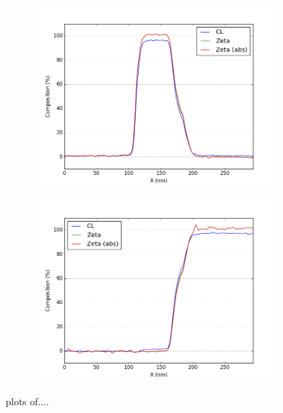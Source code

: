 \begin{figure}
\begin{subfigure}{.45\textwidth}
		\caption{}
		\label{fig:zeta_area1_as}
	\end{subfigure}
\hfill
		\begin{subfigure}{.45\textwidth}
			\centering
			\includegraphics[width=\linewidth]{fig/q/1_pd_nm}
			\caption{}
			\label{fig:zeta_area1_pd}
		\end{subfigure}%
	\hfill
		\begin{subfigure}{.45\textwidth}
			\centering
			\includegraphics[width=\linewidth]{fig/q/1_ge_nm}
			\caption{}
			\label{fig:zeta_area1_ge}
	\end{subfigure}
\hfill
	\caption{plots of....}
	\label{fig:zeta_area1}
\end{figure}

